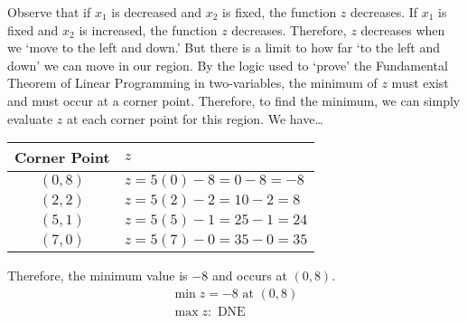 \documentclass[11pt,letterpaper]{article}
\begin{document}
Observe that if $x_1$ is decreased and $x_2$ is fixed, the function $z$ decreases. If $x_1$ is fixed and $x_2$ is increased, the function $z$ decreases. Therefore, $z$ decreases when we `move to the left and down.' But there is a limit to how far `to the left and down' we can move in our region. By the logic used to `prove' the Fundamental Theorem of Linear Programming in two-variables, the minimum of $z$ must exist and must occur at a corner point. Therefore, to find the minimum, we can simply evaluate $z$ at each corner point for this region. We have\dots \par
	\begin{table}[!ht]
	\centering
	\begin{tabular}{c|l}
	Corner Point & $z$ \\ \hline
	$(0, 8)$ & $z= 5(0) - 8= 0 - 8= -8$ \\
	$(2, 2)$ & $z= 5(2) - 2= 10 - 2= 8$ \\
	$(5, 1)$ & $z= 5(5) - 1= 25 - 1= 24$ \\
	$(7, 0)$ & $z= 5(7) - 0= 35 - 0= 35$
	\end{tabular}
	\end{table} \par
Therefore, the minimum value is $-8$ and occurs at $(0, 8)$.
	\[
	\boxed{
	\begin{gathered}
	\min z= -8 \text{ at } (0, 8) \\
	\max z \colon \text{ DNE}
	\end{gathered}
	}
	\]	
\end{document}
